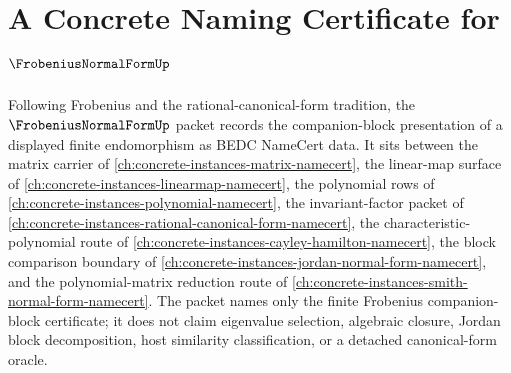 \chapter{A Concrete Naming Certificate for $\FrobeniusNormalFormUp$}
\label{ch:concrete-instances-frobenius-normal-form-namecert}

Following Frobenius and the rational-canonical-form tradition, the $\FrobeniusNormalFormUp$ packet records the companion-block presentation of a displayed finite endomorphism as BEDC NameCert data. It sits between the matrix carrier of \autoref{ch:concrete-instances-matrix-namecert}, the linear-map surface of \autoref{ch:concrete-instances-linearmap-namecert}, the polynomial rows of \autoref{ch:concrete-instances-polynomial-namecert}, the invariant-factor packet of \autoref{ch:concrete-instances-rational-canonical-form-namecert}, the characteristic-polynomial route of \autoref{ch:concrete-instances-cayley-hamilton-namecert}, the block comparison boundary of \autoref{ch:concrete-instances-jordan-normal-form-namecert}, and the polynomial-matrix reduction route of \autoref{ch:concrete-instances-smith-normal-form-namecert}. The packet names only the finite Frobenius companion-block certificate; it does not claim eigenvalue selection, algebraic closure, Jordan block decomposition, host similarity classification, or a detached canonical-form oracle.

